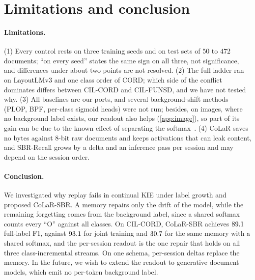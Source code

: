 \documentclass[10pt,twocolumn,letterpaper]{article}
\begin{document}
\section{Limitations and conclusion}
\label{sec:limitations}
\label{sec:conclusion}
\paragraph{Limitations.} (1) Every control rests on three training seeds and on test sets of $50$ to $472$ documents; ``on every seed'' states the same sign on all three, not significance, and differences under about two points are not resolved. (2) The full ladder ran on LayoutLMv3 and one class order of CORD; which side of the conflict dominates differs between CIL-CORD and CIL-FUNSD, and we have not tested why. (3) All baselines are our ports, and several background-shift methods (PLOP, BPF, per-class sigmoid heads) were not run; besides, on images, where no background label exists, our readout also helps (\cref{app:image}), so part of its gain can be due to the known effect of separating the softmax~\citep{ahn2021ssil}. (4) CoLaR saves no bytes against 8-bit raw documents and keeps activations that can leak content, and SBR-Recall grows by a delta and an inference pass per session and may depend on the session order.

\paragraph{Conclusion.} We investigated why replay fails in continual KIE under label growth and proposed CoLaR-SBR. A memory repairs only the drift of the model, while the remaining forgetting comes from the background label, since a shared softmax counts every ``O'' against all classes. On CIL-CORD, CoLaR-SBR achieves $89.1$ full-label F1, against $93.1$ for joint training and $30.7$ for the same memory with a shared softmax, and the per-session readout is the one repair that holds on all three class-incremental streams. On one schema, per-session deltas replace the memory. In the future, we wish to extend the readout to generative document models, which emit no per-token background label.\label{mainend}%
\end{document}
